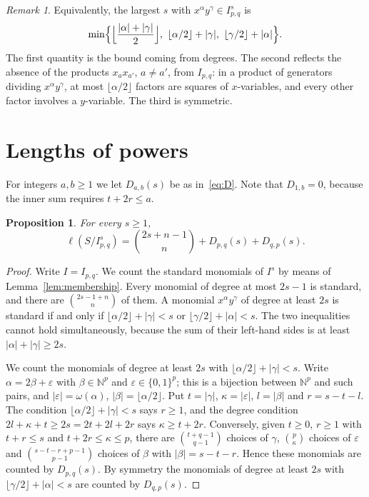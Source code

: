 \documentclass{amsart}
\newtheorem{proposition}[theorem]{Proposition}
\theoremstyle{definition}
\theoremstyle{remark}
\newtheorem{remark}[theorem]{Remark}
\numberwithin{equation}{section}
\newcommand{\NN}{\mathbb{N}}
\newcommand{\fl}[1]{\lfloor #1\rfloor}
\begin{document}
\begin{remark}\label{rem:order}
Equivalently, the largest $s$ with $x^\alpha y^\gamma\in I_{p,q}^s$ is
\[
  \min\Bigl\{\Bigl\lfloor\frac{|\alpha|+|\gamma|}{2}\Bigr\rfloor,\
  \fl{\alpha/2}+|\gamma|,\ \fl{\gamma/2}+|\alpha|\Bigr\}.
\]
The first quantity is the bound coming from degrees. The second reflects the
absence of the products $x_ax_{a'}$, $a\ne a'$, from $I_{p,q}$: in a product of
generators dividing $x^\alpha y^\gamma$, at most $\fl{\alpha/2}$ factors are
squares of $x$-variables, and every other factor involves a $y$-variable. The
third is symmetric.
\end{remark}

\section{Lengths of powers}\label{sec:lengths}

For integers $a,b\ge1$ we let $D_{a,b}(s)$ be as in~\eqref{eq:D}. Note that
$D_{1,b}=0$, because the inner sum requires $t+2r\le a$.

\begin{proposition}\label{prop:length}
For every $s\ge1$,
\[
  \ell(S/I_{p,q}^s)=\binom{2s+n-1}{n}+D_{p,q}(s)+D_{q,p}(s).
\]
\end{proposition}

\begin{proof}
Write $I=I_{p,q}$. We count the standard monomials of $I^s$ by
means of Lemma~\ref{lem:membership}. Every monomial of degree at most $2s-1$ is
standard, and there are $\binom{2s-1+n}{n}$ of them. A monomial
$x^\alpha y^\gamma$ of degree at least $2s$ is standard if and only if
$\fl{\alpha/2}+|\gamma|<s$ or $\fl{\gamma/2}+|\alpha|<s$. The two inequalities
cannot hold simultaneously, because the sum of their left-hand sides is at least
$|\alpha|+|\gamma|\ge2s$.

We count the monomials of degree at least $2s$ with
$\fl{\alpha/2}+|\gamma|<s$. Write $\alpha=2\beta+\varepsilon$ with
$\beta\in\NN^p$ and $\varepsilon\in\{0,1\}^p$; this is a bijection between
$\NN^p$ and such pairs, and $|\varepsilon|=\omega(\alpha)$,
$|\beta|=\fl{\alpha/2}$. Put $t=|\gamma|$, $\kappa=|\varepsilon|$, $l=|\beta|$ and
$r=s-t-l$. The condition $\fl{\alpha/2}+|\gamma|<s$ says $r\ge1$, and the degree
condition $2l+\kappa+t\ge2s=2t+2l+2r$ says $\kappa\ge t+2r$. Conversely, given $t\ge0$,
$r\ge1$ with $t+r\le s$ and $t+2r\le \kappa\le p$, there are $\binom{t+q-1}{q-1}$
choices of $\gamma$, $\binom{p}{\kappa}$ choices of $\varepsilon$ and
$\binom{s-t-r+p-1}{p-1}$ choices of $\beta$ with $|\beta|=s-t-r$. Hence these
monomials are counted by $D_{p,q}(s)$. By symmetry the monomials of degree at
least $2s$ with $\fl{\gamma/2}+|\alpha|<s$ are counted by $D_{q,p}(s)$.
\end{proof}
\end{document}
